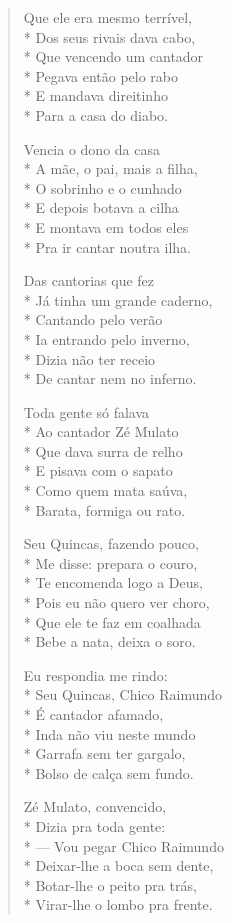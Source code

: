 \begin{verse}
Que ele era mesmo terrível,\\*
Dos seus rivais dava cabo,\\*
Que vencendo um cantador\\*
Pegava então pelo rabo\\*
E mandava direitinho\\*
Para a casa do diabo.

Vencia o dono da casa\\*
A mãe, o pai, mais a filha,\\*
O sobrinho e o cunhado\\*
E depois botava a cilha\\*
E montava em todos eles\\*
Pra ir cantar noutra ilha.

Das cantorias que fez\\*
Já tinha um grande caderno,\\*
Cantando pelo verão\\*
Ia entrando pelo inverno,\\*
Dizia não ter receio\\*
De cantar nem no inferno.

Toda gente só falava\\*
Ao cantador Zé Mulato\\*
Que dava surra de relho\\*
E pisava com o sapato\\*
Como quem mata saúva,\\*
Barata, formiga ou rato.

Seu Quincas, fazendo pouco,\\*
Me disse: prepara o couro,\\*
Te encomenda logo a Deus,\\*
Pois eu não quero ver choro,\\*
Que ele te faz em coalhada\\*
Bebe a nata, deixa o soro.

Eu respondia me rindo:\\*
Seu Quincas, Chico Raimundo\\*
É cantador afamado,\\*
Inda não viu neste mundo\\*
Garrafa sem ter gargalo,\\*
Bolso de calça sem fundo.

Zé Mulato, convencido,\\*
Dizia pra toda gente: \\*
— Vou pegar Chico Raimundo\\*
Deixar-lhe a boca sem dente,\\*
Botar-lhe o peito pra trás,\\*
Virar-lhe o lombo pra frente.


\end{verse}

